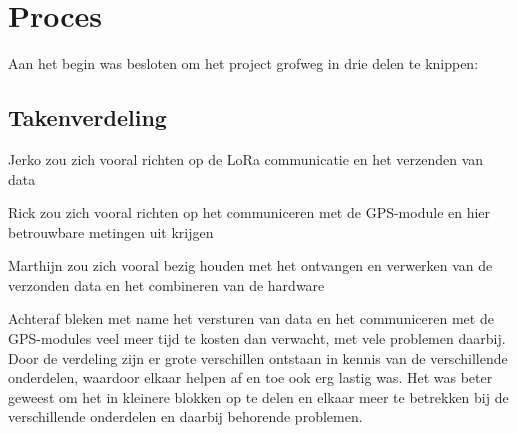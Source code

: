\section{Proces}
Aan het begin was besloten om het project grofweg in drie delen te knippen:

\subsection{Takenverdeling}
Jerko zou zich vooral richten op de LoRa communicatie en het verzenden van data

Rick zou zich vooral richten op het communiceren met de GPS-module en hier
betrouwbare metingen uit krijgen

Marthijn zou zich vooral bezig houden met het ontvangen en verwerken van de
verzonden data en het combineren van de hardware

Achteraf bleken met name het versturen van data en het communiceren met de
GPS-modules veel meer tijd te kosten dan verwacht, met vele problemen daarbij.
Door de verdeling zijn er grote verschillen ontstaan in kennis van de
verschillende onderdelen, waardoor elkaar helpen af en toe ook erg lastig was.
Het was beter geweest om het in kleinere blokken op te delen en elkaar meer te
betrekken bij de verschillende onderdelen en daarbij behorende problemen.
